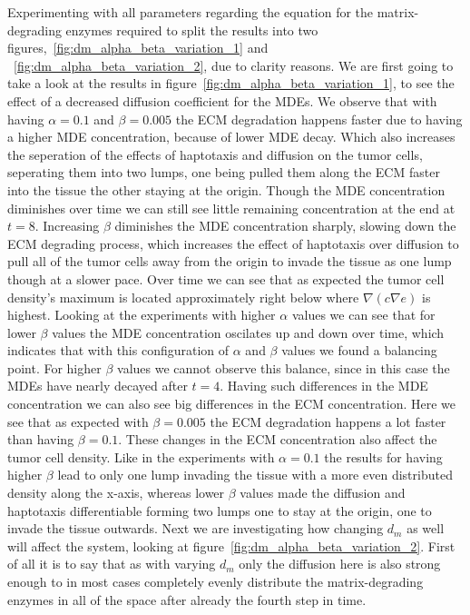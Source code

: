 Experimenting with all parameters regarding the equation for the matrix-degrading enzymes required to split the results into two figures,~\ref{fig:dm_alpha_beta_variation_1} and ~\ref{fig:dm_alpha_beta_variation_2}, due to clarity reasons. 
We are first going to take a look at the results in figure~\ref{fig:dm_alpha_beta_variation_1}, to see the effect of a decreased diffusion coefficient for the MDEs. We observe that with having $\alpha =0.1$ and $\beta=0.005$ the ECM degradation happens faster due to having a higher MDE concentration, because of lower MDE decay. Which also increases the seperation of the effects of haptotaxis and diffusion on the tumor cells, seperating them into two lumps, one being pulled them along the ECM faster into the tissue the other staying at the origin. Though the MDE concentration diminishes over time we can still see little remaining concentration at the end at $t=8$. Increasing $\beta$ diminishes the MDE concentration sharply, slowing down the ECM degrading process, which increases the effect of haptotaxis over diffusion to pull all of the tumor cells away from the origin to invade the tissue as one lump though at a slower pace. Over time we can see that as expected the tumor cell density's maximum is located approximately right below where $\nabla (c \nabla e)$ is highest. \newline
Looking at the experiments with higher $\alpha$ values we can see that for lower $\beta$ values the MDE concentration oscilates up and down over time, which indicates that with this configuration of $\alpha$ and $\beta$ values we found a balancing point. For higher $\beta$ values we cannot observe this balance, since in this case the MDEs have nearly decayed after $t=4$. Having such differences in the MDE concentration we can also see big differences in the ECM concentration. Here we see that as expected with $\beta=0.005$ the ECM degradation happens a lot faster than having $\beta=0.1$. These changes in the ECM concentration also affect the tumor cell density. Like in the experiments with $\alpha=0.1$ the results for having higher $\beta$ lead to only one lump invading the tissue with a more even distributed density along the x-axis, whereas lower $\beta$ values made the diffusion and haptotaxis differentiable forming two lumps one to stay at the origin, one to invade the tissue outwards.\newline 
Next we are investigating how changing $d_m$ as well will affect the system, looking at figure~\ref{fig:dm_alpha_beta_variation_2}. First of all it is to say that as with varying $d_m$ only the diffusion here is also strong enough to in most cases completely evenly distribute the matrix-degrading enzymes in all of the space after already the fourth step in time. \newline 
